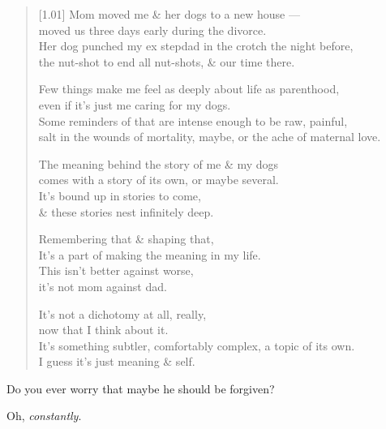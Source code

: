 \begin{paracol}{2}
\begin{leftcolumn}
\begin{verse}[1.01\textwidth]
  Mom moved me \& her dogs to a new house ---\\
  \vin moved us three days early during the divorce.\\
  Her dog punched my ex stepdad in the crotch the night before,\\
  \vin the nut-shot to end all nut-shots, \& our time there.

  Few things make me feel as deeply about life as parenthood,\\
  \vin even if it's just me caring for my dogs.\\
  Some reminders of that are intense enough to be raw, painful,\\
  \vin salt in the wounds of mortality, maybe, or the ache of maternal love.

  The meaning behind the story of me \& my dogs\\
  \vin comes with a story of its own, or maybe several.\\
  It's bound up in stories to come,\\
  \vin \& these stories nest infinitely deep.

  Remembering that \& shaping that,\\
  \vin It's a part of making the meaning in my life.\\
  This isn't better against worse,\\
  \vin it's not mom against dad.

  It's not a dichotomy at all, really,\\
  \vin now that I think about it.\\
  It's something subtler, comfortably complex, a topic of its own.\\
  \vin I guess it's just meaning \& self.
\end{verse}

\newpage

\null
\vfill
\begin{ally}
Do you ever worry that maybe he should be forgiven?
\end{ally}
Oh, \emph{constantly}.
\vfill
\newpage
\end{leftcolumn}
\end{paracol}
\resetbackgroundcolor
{}
